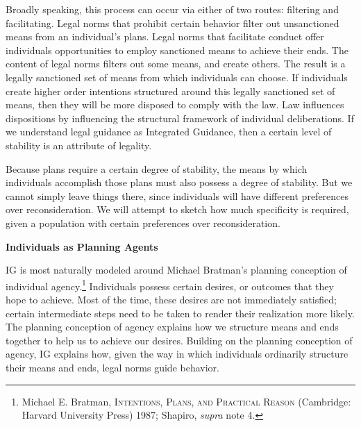 Broadly speaking, this process can occur via either of two routes:
filtering and facilitating. Legal norms that prohibit certain behavior
filter out unsanctioned means from an individual's plans. Legal norms
that facilitate conduct offer individuals opportunities to employ
sanctioned means to achieve their ends. The content of legal norms
filters out some means, and create others. The result is a legally
sanctioned set of means from which individuals can choose. If
individuals create higher order intentions structured around this
legally sanctioned set of means, then they will be more disposed to
comply with the law. Law influences dispositions by influencing the
structural framework of individual deliberations. If we understand legal
guidance as Integrated Guidance, then a certain level of stability is an
attribute of legality.

Because plans require a certain degree of stability, the means by which
individuals accomplish those plans must also possess a degree of
stability. But we cannot simply leave things there, since individuals
will have different preferences over reconsideration. We will attempt to
sketch how much specificity is required, given a population with certain
preferences over reconsideration.

\textbf{Individuals as Planning Agents}

IG is most naturally modeled around Michael Bratman's planning
conception of individual agency.\footnote{Michael E. Bratman,
  \textsc{Intentions, Plans, and Practical Reason} (Cambridge: Harvard
  University Press) 1987; Shapiro, \emph{supra} note 4.} Individuals
possess certain desires, or outcomes that they hope to achieve. Most of
the time, these desires are not immediately satisfied; certain
intermediate steps need to be taken to render their realization more
likely. The planning conception of agency explains how we structure
means and ends together to help us to achieve our desires. Building on
the planning conception of agency, IG explains how, given the way in
which individuals ordinarily structure their means and ends, legal norms
guide behavior.

